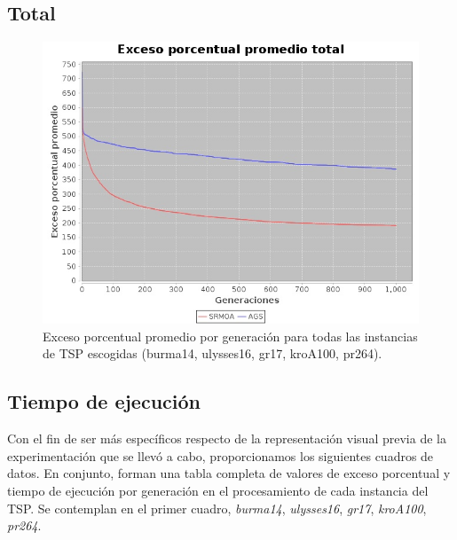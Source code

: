 \documentclass[12pt]{article}
\begin{document}
\subsection{Total}
\begin{figure}[H]
  \centering
  \includegraphics[width=1\textwidth]{graficas/total}
  \caption{Exceso porcentual promedio por generación para todas las instancias de TSP escogidas (burma14, ulysses16, gr17, kroA100, pr264).}
\end{figure}

\newpage
\subsection{Tiempo de ejecución}
Con el fin de ser más específicos respecto de la representación visual
previa de la experimentación que se llevó a cabo, proporcionamos los siguientes cuadros de datos. En conjunto, forman una tabla completa de valores de exceso porcentual y tiempo de ejecución por generación en el procesamiento de cada instancia del TSP. Se contemplan en el primer cuadro, \textit{burma14}, \textit{ulysses16}, \textit{gr17}, \textit{kroA100}, \textit{pr264}.
\end{document}
